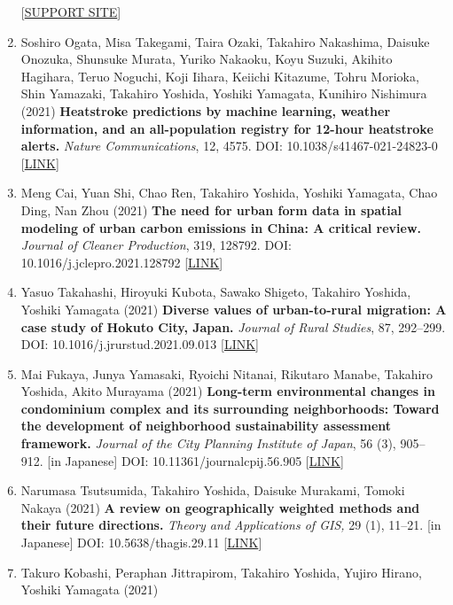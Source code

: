 \documentclass[
]{book}
\begin{document}
\begin{enumerate}
  {[}\href{https://gcp-tsukuba.github.io/SSP-downscale/}{SUPPORT SITE}{]}
\item
  Soshiro Ogata, Misa Takegami, Taira Ozaki, Takahiro Nakashima, Daisuke Onozuka, Shunsuke Murata, Yuriko Nakaoku, Koyu Suzuki, Akihito Hagihara, Teruo Noguchi, Koji Iihara, Keiichi Kitazume, Tohru Morioka, Shin Yamazaki, Takahiro Yoshida, Yoshiki Yamagata, Kunihiro Nishimura (2021)
  \textbf{Heatstroke predictions by machine learning, weather information, and an all-population registry for 12-hour heatstroke alerts.}
  \emph{Nature Communications}, 12, 4575.
  DOI: 10.1038/s41467-021-24823-0 {[}\href{https://www.nature.com/articles/s41467-021-24823-0}{LINK}{]}
\item
  Meng Cai, Yuan Shi, Chao Ren, Takahiro Yoshida, Yoshiki Yamagata, Chao Ding, Nan Zhou (2021)
  \textbf{The need for urban form data in spatial modeling of urban carbon emissions in China: A critical review.}
  \emph{Journal of Cleaner Production}, 319, 128792.
  DOI: 10.1016/j.jclepro.2021.128792 {[}\href{https://doi.org/10.1016/j.jclepro.2021.128792}{LINK}{]}
\item
  Yasuo Takahashi, Hiroyuki Kubota, Sawako Shigeto, Takahiro Yoshida, Yoshiki Yamagata (2021)
  \textbf{Diverse values of urban-to-rural migration: A case study of Hokuto City, Japan.}
  \emph{Journal of Rural Studies}, 87, 292--299.
  DOI: 10.1016/j.jrurstud.2021.09.013 {[}\href{https://www.sciencedirect.com/science/article/abs/pii/S0743016721002771}{LINK}{]}
\item
  Mai Fukaya, Junya Yamasaki, Ryoichi Nitanai, Rikutaro Manabe, Takahiro Yoshida, Akito Murayama (2021)
  \textbf{Long-term environmental changes in condominium complex and its surrounding neighborhoods: Toward the development of neighborhood sustainability assessment framework.}
  \emph{Journal of the City Planning Institute of Japan}, 56 (3), 905--912. {[}in Japanese{]}
  DOI: 10.11361/journalcpij.56.905 {[}\href{https://www.jstage.jst.go.jp/article/journalcpij/56/3/56_905/_article/-char/en}{LINK}{]}
\item
  Narumasa Tsutsumida, Takahiro Yoshida, Daisuke Murakami, Tomoki Nakaya (2021)
  \textbf{A review on geographically weighted methods and their future directions.}
  \emph{Theory and Applications of GIS,} 29 (1), 11--21. {[}in Japanese{]}
  DOI: 10.5638/thagis.29.11 {[}\href{https://www.jstage.jst.go.jp/article/thagis/29/1/29_11/_article/-char/en}{LINK}{]}
\item
  Takuro Kobashi, Peraphan Jittrapirom, Takahiro Yoshida, Yujiro Hirano, Yoshiki Yamagata (2021)

\end{enumerate}
\end{document}
